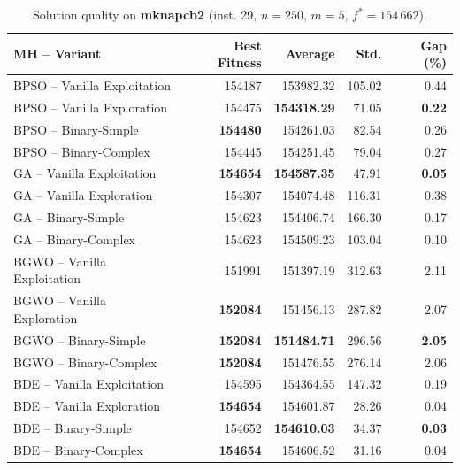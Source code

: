 \begin{table}[htbp]
  \centering
  \small
  \caption{Solution quality on \textbf{mknapcb2} (inst. 29, $n=250$, $m=5$, $f^*=154\,662$).}
  \label{tab:calidad_mknapcb2_29}
  \begin{tabular}{lrrrr}
    \toprule
    \textbf{MH -- Variant} &
    \textbf{Best Fitness} &
    \textbf{Average} &
    \textbf{Std.} &
    \textbf{Gap (\%)} \\
    \midrule
    BPSO -- Vanilla Exploitation &         154187 &        153982.32 & 105.02 &         0.44 \\
    BPSO -- Vanilla Exploration  &         154475 & \textbf{154318.29} &  71.05 & \textbf{0.22} \\
    BPSO -- Binary-Simple        & \textbf{154480} &        154261.03 &  82.54 &         0.26 \\
    BPSO -- Binary-Complex       &         154445 &        154251.45 &  79.04 &         0.27 \\
    \midrule
    GA -- Vanilla Exploitation   & \textbf{154654} & \textbf{154587.35} &  47.91 & \textbf{0.05} \\
    GA -- Vanilla Exploration    &         154307 &        154074.48 & 116.31 &         0.38 \\
    GA -- Binary-Simple          &         154623 &        154406.74 & 166.30 &         0.17 \\
    GA -- Binary-Complex         &         154623 &        154509.23 & 103.04 &         0.10 \\
    \midrule
    BGWO -- Vanilla Exploitation &         151991 &        151397.19 & 312.63 &         2.11 \\
    BGWO -- Vanilla Exploration  & \textbf{152084} &        151456.13 & 287.82 &         2.07 \\
    BGWO -- Binary-Simple        & \textbf{152084} & \textbf{151484.71} & 296.56 & \textbf{2.05} \\
    BGWO -- Binary-Complex       & \textbf{152084} &        151476.55 & 276.14 &         2.06 \\
    \midrule
    BDE -- Vanilla Exploitation  &         154595 &        154364.55 & 147.32 &         0.19 \\
    BDE -- Vanilla Exploration   & \textbf{154654} &        154601.87 &  28.26 &         0.04 \\
    BDE -- Binary-Simple         &         154652 & \textbf{154610.03} &  34.37 & \textbf{0.03} \\
    BDE -- Binary-Complex        & \textbf{154654} &        154606.52 &  31.16 &         0.04 \\
    \bottomrule
  \end{tabular}
\end{table}

